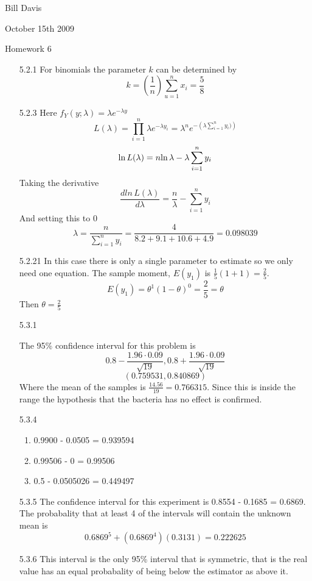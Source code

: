 \documentclass[11pt,fleqn]{article}
\begin{document}
\newcommand{\mbf}[1]{\mbox{{\bfseries #1}}}
\newcommand{\N}{\mbf{N}}
\renewcommand{\O}{\mbf{O}}
\newcommand{\tabfrac}[2]{%
	\setlength{\fboxrule}{0pt}%
	\fbox{$\frac{#1}{#2}$}%
}

\noindent Bill Davis 

\noindent October 15th 2009 

\noindent Homework 6

\begin{enumerate}
  
  \item[5.2.1]
  For binomials the parameter $k$ can be determined by 
  \[
  k = \left(\frac{1}{n}\right)\sum_{u=1}^n x_i = \frac{5}{8}
  \]
  \item[5.2.3]
  Here $f_Y(y;\lambda) = \lambda e^{-\lambda y}$ 
  \[
  L(\lambda) = \displaystyle\prod_{i=1}^n \lambda e^{-\lambda y_i} = \lambda^n
  e^{-\left(\lambda \sum_{i=1}^n y_i)\right)}
  \]
  \[
  $ln$\, L(\lambda) = n $ln$\, \lambda - \lambda \displaystyle\sum_{i=1}^n y_i
  \]
  Taking the derivative
  \[
  \frac{d ln\, L(\lambda)}{d\lambda} = \frac{n}{\lambda} -
  \displaystyle\sum_{i=1}^n y_i
  \]
  And setting this to 0 
  \[
  \lambda = \frac{n}{\displaystyle\sum_{i=1}^{n} y_i} =
  \frac{4}{8.2+9.1+10.6+4.9}  = 0.098039
  \]
  \item[5.2.21]
  In this case there is only a single parameter to estimate so we only need one
  equation. The sample moment,  $E(y_1)$ is $\frac{1}{5}(1+1) = \frac{2}{5}$.
  \[
  E(y_1) = \theta^1(1-\theta)^0 = \frac{2}{5} = \theta
  \]
  Then $\theta = \frac{2}{5}$
  \item[5.3.1]
  
  The 95\% confidence interval for this problem is 
  \[
  0.8 - \frac{1.96\cdot0.09}{\sqrt{19}}, 0.8 + \frac{1.96\cdot0.09}{\sqrt{19}} 
  \]
  \[
  (0.759531,0.840869)
  \]
  Where the mean of the samples is $\frac{14.56}{19} = 0.766315$. Since this is
  inside the range the hypothesis that the bacteria has no effect is confirmed. 
  \item[5.3.4]
  \begin{enumerate}
      \item 
      	0.9900 - 0.0505 = 0.939594
      \item
      	0.99506 - 0 = 0.99506
      \item 
      	0.5 - 0.0505026 = 0.449497
  \end{enumerate}
  \item[5.3.5]
  The confidence interval for this experiment is 0.8554 - 0.1685 = 0.6869. The
  probabality that at least 4 of the intervals will contain the unknown mean is 
  \[
  0.6869^5 + (0.6869^4)(0.3131) = 0.222625
  \]
  \item[5.3.6]
  This interval is the only 95\% interval that is symmetric, that is the real
  value has an equal probabality of being below the estimator as above it.
  

\end{enumerate}
\end{document}
